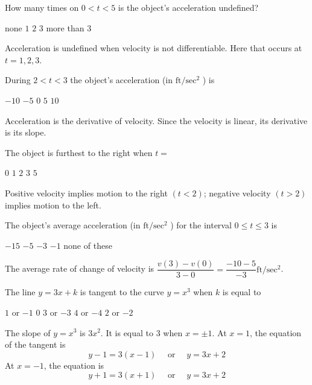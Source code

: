 \question
How many times on $0<t<5$ is the object's acceleration undefined?
\begin{choices}
  \choice none
  \choice $1$
  \choice $2$
  \CorrectChoice $3$
  \choice more than $3$
\end{choices}
\begin{solution}
Acceleration is undefined when velocity is not differentiable. Here that occurs at $t=1,2,3$.
\end{solution}

\question
During $2<t<3$ the object's acceleration (in $\mathrm{ft} / \mathrm{sec}^{2}$ ) is
\begin{choices}
  \CorrectChoice $-10$
  \choice $-5$
  \choice $0$
  \choice $5$
  \choice $10$
\end{choices}
\begin{solution}
Acceleration is the derivative of velocity. Since the velocity is linear, its derivative is its slope.
\end{solution}

\question
The object is furthest to the right when $t=$
\begin{choices}
  \choice $0$
  \choice $1$
  \CorrectChoice $2$
  \choice $3$
  \choice $5$
\end{choices}
\begin{solution}
Positive velocity implies motion to the right $(t<2)$; negative velocity $(t>2)$ implies motion to the left.
\end{solution}





\newpage




\question\label{calc04:velgraph-last}
The object's average acceleration (in $\mathrm{ft} / \mathrm{sec}^{2}$ ) for the interval $0 \leqslant t \leqslant 3$ is
\begin{choices}
  \choice $-15$
  \CorrectChoice $-5$
  \choice $-3$
  \choice $-1$
  \choice none of these
\end{choices}
\begin{solution}
The average rate of change of velocity is $\dfrac{v(3)-v(0)}{3-0}=\dfrac{-10-5}{-3} \mathrm{ft} / \mathrm{sec}^{2}$.
\end{solution}






\question
The line $y=3 x+k$ is tangent to the curve $y=x^{3}$ when $k$ is equal to
\begin{choices}
  \choice $1$ or $-1$
  \choice $0$
  \choice $3$ or $-3$
  \choice $4$ or $-4$
  \CorrectChoice $2$ or $-2$
\end{choices}
\begin{solution}
The slope of $y=x^{3}$ is $3 x^{2}$. It is equal to 3 when $x= \pm 1$. At $x=1$, the equation of the tangent is
\[
y-1=3(x-1) \quad \text { or } \quad y=3 x+2
\]
At $x=-1$, the equation is
\[
y+1=3(x+1) \quad \text { or } \quad y=3 x+2
\]
\end{solution}





